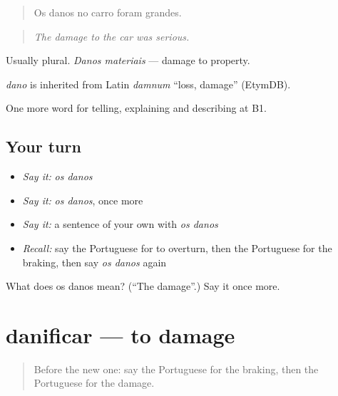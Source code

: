 \begin{quote}
Os danos no carro foram grandes.
\end{quote}

\begin{quote}
\emph{The damage to the car was serious.}
\end{quote}

Usually plural. \emph{Danos materiais} — damage to property.

\begin{cousinweb}
\emph{dano} is inherited from Latin \emph{damnum} \textquotedblleft{}loss, damage\textquotedblright{} (EtymDB).
\end{cousinweb}

\begin{grammarlens}[title={What you've built}]
One more word for telling, explaining and describing at B1.
\end{grammarlens}

\subsection*{Your turn}
\begin{itemize}
\raggedright
  \item \emph{Say it:} \emph{os danos}
  \item \emph{Say it:} \emph{os danos}, once more
  \item \emph{Say it:} a sentence of your own with \emph{os danos}
  \item \emph{Recall:} say the Portuguese for to overturn, then the Portuguese for the braking, then say \emph{os danos} again
\end{itemize}

\begin{tcolorbox}[breakable,colback=teal!4,colframe=teal!35!black,title={Before you move on}]
What does os danos mean? (\textquotedblleft{}The damage\textquotedblright{}.) Say it once more.
\end{tcolorbox}
\section[danificar]{danificar — to damage}

\label{lesson:PT-C300-danificar}



\begin{quote}
Before the new one: say the Portuguese for the braking, then the Portuguese for the damage.
\end{quote}

